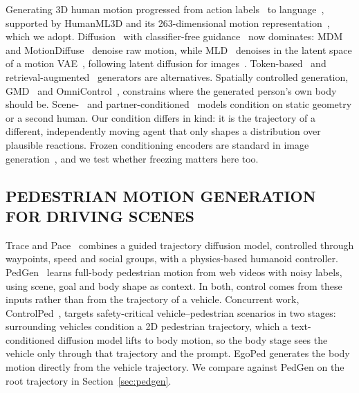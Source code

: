 \documentclass{ieeeoj}
\newcommand{\method}{EgoPed\xspace}
\begin{document}
Generating 3D human motion progressed from action labels~\cite{petrovich2021actor} to language~\cite{petrovich2022temos}, supported by HumanML3D and its 263-dimensional motion representation~\cite{guo2022humanml3d}, which we adopt. Diffusion~\cite{ho2020ddpm,song2021ddim} with classifier-free guidance~\cite{ho2022cfg} now dominates: MDM~\cite{tevet2023mdm} and MotionDiffuse~\cite{zhang2022motiondiffuse} denoise raw motion, while MLD~\cite{chen2023mld} denoises in the latent space of a motion VAE~\cite{kingma2014vae}, following latent diffusion for images~\cite{rombach2022sd}. Token-based~\cite{zhang2023t2mgpt,guo2024momask,jiang2023motiongpt} and retrieval-augmented~\cite{zhang2023remodiffuse} generators are alternatives. Spatially controlled generation, GMD~\cite{karunratanakul2023gmd} and OmniControl~\cite{xie2024omnicontrol}, constrains where the generated person's own body should be. Scene-~\cite{hassan2019prox,hassan2021samp,wang2022humanise,jiang2024trumans} and partner-conditioned~\cite{liang2024intergen} models condition on static geometry or a second human. Our condition differs in kind: it is the trajectory of a different, independently moving agent that only shapes a distribution over plausible reactions. Frozen conditioning encoders are standard in image generation~\cite{rombach2022sd,ye2023ipadapter,zhang2023controlnet}, and we test whether freezing matters here too.

\subsection{PEDESTRIAN MOTION GENERATION FOR DRIVING SCENES}

Trace and Pace~\cite{rempe2023tracepace} combines a guided trajectory diffusion model, controlled through waypoints, speed and social groups, with a physics-based humanoid controller. PedGen~\cite{liu2025pedgen} learns full-body pedestrian motion from web videos with noisy labels, using scene, goal and body shape as context. In both, control comes from these inputs rather than from the trajectory of a vehicle. Concurrent work, ControlPed~\cite{liu2026controlped}, targets safety-critical vehicle--pedestrian scenarios in two stages: surrounding vehicles condition a 2D pedestrian trajectory, which a text-conditioned diffusion model lifts to body motion, so the body stage sees the vehicle only through that trajectory and the prompt. \method generates the body motion directly from the vehicle trajectory. We compare against PedGen on the root trajectory in Section~\ref{sec:pedgen}.
\end{document}
